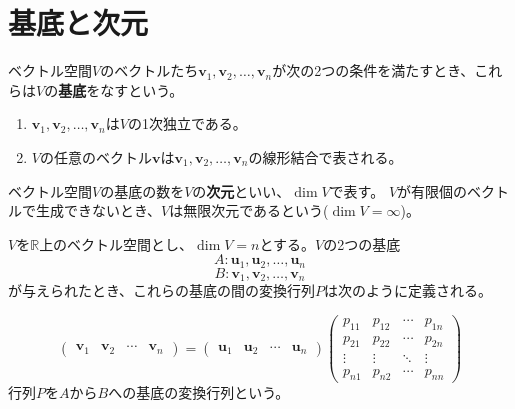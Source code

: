 \documentclass{jlreq}
\begin{document}
\section{基底と次元}
\begin{definitionbox}[基底]
  ベクトル空間$V$のベクトルたち$\boldsymbol{v}_1, \boldsymbol{v}_2, \ldots, \boldsymbol{v}_n$が次の2つの条件を満たすとき、これらは$V$の\textbf{基底}をなすという。

  \begin{enumerate}
    \item $\boldsymbol{v}_1, \boldsymbol{v}_2, \ldots, \boldsymbol{v}_n$は$V$の1次独立である。
    \item $V$の任意のベクトル$\boldsymbol{v}$は$\boldsymbol{v}_1, \boldsymbol{v}_2, \ldots, \boldsymbol{v}_n$の線形結合で表される。
  \end{enumerate}
\end{definitionbox}

\begin{definitionbox}[次元]
  ベクトル空間$V$の基底の数を$V$の\textbf{次元}といい、$\dim V$で表す。
  $V$が有限個のベクトルで生成できないとき、$V$は無限次元であるという($\dim V = \infty$)。
\end{definitionbox}


\begin{definitionbox}[基底の変換行列]
  $V$を$\mathbb{R}$上のベクトル空間とし、$\dim V = n$とする。$V$の2つの基底
  \begin{equation*}
   A:  \boldsymbol{u}_1, \boldsymbol{u}_2, \ldots, \boldsymbol{u}_n
  \end{equation*}
  \begin{equation*}
    B: \boldsymbol{v}_1, \boldsymbol{v}_2, \ldots, \boldsymbol{v}_n
  \end{equation*}
  が与えられたとき、これらの基底の間の変換行列$P$は次のように定義される。

  \begin{equation*}
    \begin{pmatrix}
      \boldsymbol{v}_1 & \boldsymbol{v}_2 & \cdots & \boldsymbol{v}_n
    \end{pmatrix} = 
    \begin{pmatrix}
      \boldsymbol{u}_1 & \boldsymbol{u}_2 & \cdots & \boldsymbol{u}_n
    \end{pmatrix}
    \begin{pmatrix}
      p_{11} & p_{12} & \cdots & p_{1n} \\
      p_{21} & p_{22} & \cdots & p_{2n} \\
      \vdots & \vdots & \ddots & \vdots \\
      p_{n1} & p_{n2} & \cdots & p_{nn}
    \end{pmatrix}
  \end{equation*}
  行列$P$を$A$から$B$への基底の変換行列という。
\end{definitionbox}
\end{document}
